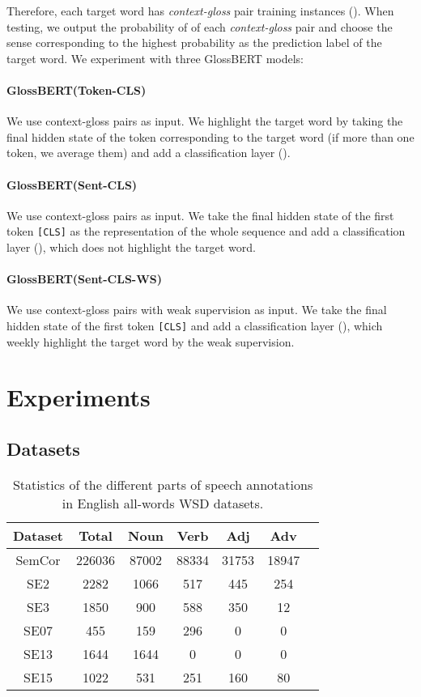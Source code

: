 \documentclass[11pt,a4paper]{article}
\begin{document}
Therefore, each target word has  \textit{context-gloss} pair training instances (). When testing, we output the probability of  of each  \textit{context-gloss} pair and choose the sense corresponding to the highest probability as the prediction label of the target word. We experiment with three GlossBERT models:

\paragraph{GlossBERT(Token-CLS)}
We use context-gloss pairs as input. We highlight the target word by taking the final hidden state of the token corresponding to the target word (if more than one token, we average them) and add a classification layer ().

\paragraph{GlossBERT(Sent-CLS)}
We use context-gloss pairs as input. We take the final hidden state of the first token \texttt{[CLS]} as the representation of the whole sequence and add a classification layer (), which does not highlight the target word.

\paragraph{GlossBERT(Sent-CLS-WS)}
We use context-gloss pairs with weak supervision as input. We take the final hidden state of the first token \texttt{[CLS]} and add a classification layer (), which weekly highlight the target word by the weak supervision.


\section{Experiments}

\subsection{Datasets}

\begin{table}[t]
    \footnotesize
    \centering
    \begin{tabular}{|c|c|c|c|c|c|c|}
         \hline
         Dataset & Total & Noun & Verb & Adj & Adv \\
         \hline
         SemCor & 226036 & 87002 & 88334 & 31753 & 18947 \\
         \hline
         SE2 & 2282 & 1066 & 517 & 445 & 254 \\
         \hline
         SE3 & 1850 & 900 & 588 & 350 & 12  \\
         \hline
         SE07 & 455 & 159 & 296 & 0 & 0 \\
         \hline
         SE13 & 1644 & 1644 & 0 & 0 & 0  \\
         \hline
         SE15 & 1022 & 531 & 251 & 160 & 80 \\
         \hline
    \end{tabular}
    \caption{Statistics of the different parts of speech annotations in English all-words WSD datasets. }
    \label{statistics}
\end{table}
\end{document}
